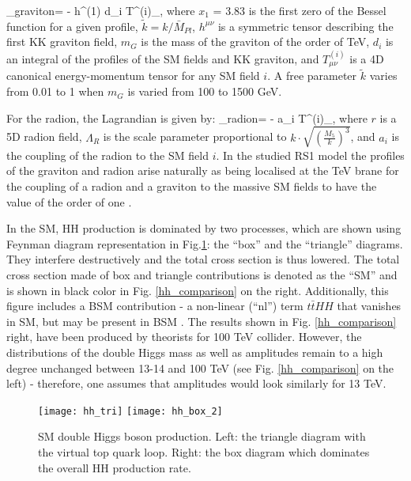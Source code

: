 \beqn\label{lagr_graviton}
\Lagr_{graviton}=  -  h^{\mu\nu(1)} \times d_i T^{(i)}_{\mu\nu},  
\eeqn
where $x_1$ = 3.83 is the first zero of the Bessel function for a given profile, $\tilde{k}  = k / \bar{M}_{Pl}$, $h^{\mu\nu}$ is a symmetric tensor describing the first KK graviton field, $m_G$ is the mass of the graviton of the order of TeV, $d_i$ is an integral of the profiles of the SM fields and KK graviton, and  $T^{(i)}_{\mu\nu}$ is a 4D canonical energy-momentum tensor \cite{Forger:2003ut} for any SM field $i$. A free parameter $\tilde{k}$ varies from 0.01 to 1 when $m_{G}$ is varied from 100 to 1500 GeV. 

For the radion, the Lagrandian is given by:
\beqn\label{lagr_radion}
\Lagr_{radion}=  -  \times a_i T^{\mu (i)}_{\mu},  
\eeqn
where $r$ is a 5D radion field, $\Lambda_R$ is the scale parameter proportional to $k \cdot \sqrt{ ( \frac{M_5}{k} )^3}$, and $a_i$ is the coupling of the radion to the SM field $i$. In the studied RS1 model the profiles of the graviton and radion arise naturally as being localised at the TeV brane for the coupling of a radion and a graviton to the massive SM fields to have the value of the order of one \cite{WED}. 


In the SM, HH production is dominated by two processes, which are shown using Feynman diagram representation in Fig.\ref{SM_HH}: the ``box'' and the ``triangle'' diagrams. They interfere destructively and the total cross section is thus lowered. The total cross section made of box and triangle contributions is denoted as the ``SM'' and is shown in black color in Fig. \ref{hh_comparison} on the right. Additionally, this figure includes a BSM contribution - a non-linear (``nl'') term $t\bar{t}HH$ that vanishes in SM, but may be present in BSM \cite{Contino:2012xk}. The results shown in Fig. \ref{hh_comparison} right, have been produced by theorists \cite{Chen:2014xra} for 100 TeV collider. However, the distributions of the double Higgs mass as well as amplitudes remain to a high degree unchanged between 13-14 and 100 TeV (see Fig. \ref{hh_comparison} on the left) - therefore, one assumes that amplitudes would look similarly for 13 TeV. 

\begin{figure}[H]
  \centering
    \texttt{[image: hh\_tri]}
     \texttt{[image: hh\_box\_2]}
    \caption[SM double Higgs boson production]{SM double Higgs boson production. Left: the triangle diagram with the virtual top quark loop. Right: the box diagram which dominates the overall HH production rate.}
    \label{SM_HH}
\end{figure}

